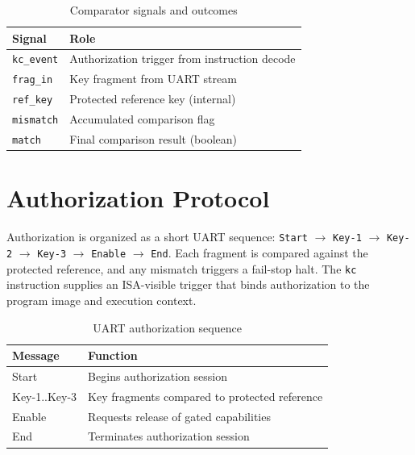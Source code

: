 \begin{table}[H]
  \centering
  \caption{Comparator signals and outcomes}
  \label{tab:comparator-signals}
  \begin{tabular}{@{}p{4.0cm}p{6.2cm}@{}}
    \toprule
    \textbf{Signal} & \textbf{Role} \\
    \midrule
    \texttt{kc\_event} & Authorization trigger from instruction decode \\
    \texttt{frag\_in} & Key fragment from UART stream \\
    \texttt{ref\_key} & Protected reference key (internal) \\
    \texttt{mismatch} & Accumulated comparison flag \\
    \texttt{match} & Final comparison result (boolean) \\
    \bottomrule
  \end{tabular}
\end{table}

\section{Authorization Protocol}
Authorization is organized as a short UART sequence: \texttt{Start} \(\rightarrow\)
\texttt{Key-1} \(\rightarrow\) \texttt{Key-2} \(\rightarrow\) \texttt{Key-3}
\(\rightarrow\) \texttt{Enable} \(\rightarrow\) \texttt{End}. Each fragment is compared
against the protected reference, and any mismatch triggers a fail-stop halt. The
\texttt{kc} instruction supplies an ISA-visible trigger that binds authorization to the
program image and execution context.

\begin{table}[H]
  \centering
  \caption{UART authorization sequence}
  \label{tab:auth-sequence}
  \begin{tabular}{@{}p{3.2cm}p{6.8cm}@{}}
    \toprule
    \textbf{Message} & \textbf{Function} \\
    \midrule
    Start & Begins authorization session \\
    Key-1..Key-3 & Key fragments compared to protected reference \\
    Enable & Requests release of gated capabilities \\
    End & Terminates authorization session \\
    \bottomrule
  \end{tabular}
\end{table}

